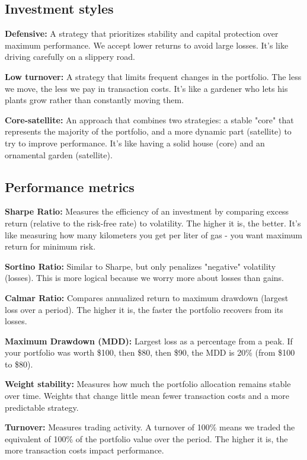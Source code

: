 \documentclass[11pt,a4paper]{article}
\begin{document}
\subsection{Investment styles}

\textbf{Defensive:} A strategy that prioritizes stability and capital protection over maximum performance. We accept lower returns to avoid large losses. It's like driving carefully on a slippery road.

\textbf{Low turnover:} A strategy that limits frequent changes in the portfolio. The less we move, the less we pay in transaction costs. It's like a gardener who lets his plants grow rather than constantly moving them.

\textbf{Core-satellite:} An approach that combines two strategies: a stable "core" that represents the majority of the portfolio, and a more dynamic part (satellite) to try to improve performance. It's like having a solid house (core) and an ornamental garden (satellite).

\subsection{Performance metrics}

\textbf{Sharpe Ratio:} Measures the efficiency of an investment by comparing excess return (relative to the risk-free rate) to volatility. The higher it is, the better. It's like measuring how many kilometers you get per liter of gas - you want maximum return for minimum risk.

\textbf{Sortino Ratio:} Similar to Sharpe, but only penalizes "negative" volatility (losses). This is more logical because we worry more about losses than gains.

\textbf{Calmar Ratio:} Compares annualized return to maximum drawdown (largest loss over a period). The higher it is, the faster the portfolio recovers from its losses.

\textbf{Maximum Drawdown (MDD):} Largest loss as a percentage from a peak. If your portfolio was worth \$100, then \$80, then \$90, the MDD is 20\% (from \$100 to \$80).

\textbf{Weight stability:} Measures how much the portfolio allocation remains stable over time. Weights that change little mean fewer transaction costs and a more predictable strategy.

\textbf{Turnover:} Measures trading activity. A turnover of 100\% means we traded the equivalent of 100\% of the portfolio value over the period. The higher it is, the more transaction costs impact performance.
\end{document}
